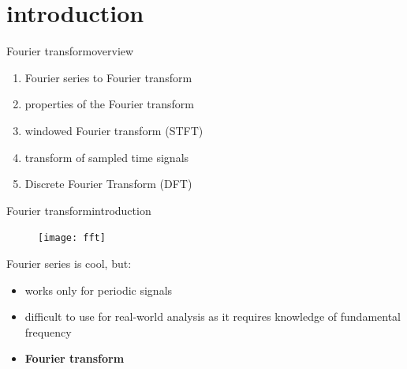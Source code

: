 



\subtitle{Part 8: Fourier Transform}


	

\section[intro]{introduction}
        \begin{frame}{Fourier transform}{overview}
            \begin{enumerate}
                \item   Fourier series to Fourier transform
                \item   properties of the Fourier transform
                \item   windowed Fourier transform (STFT)
                \item   transform of sampled time signals
                \item   Discrete Fourier Transform (DFT)
            \end{enumerate}
        \end{frame}

	\begin{frame}{Fourier transform}{introduction}
		\begin{figure}
			\centering
				\texttt{[image: fft]}
		\end{figure}
		Fourier series is cool, but:
		\begin{itemize}
			\item	works only for periodic signals 
			\item	difficult to use for real-world analysis as it requires knowledge of fundamental frequency
			\item<2->[$\Rightarrow$]	\textbf{Fourier transform}
		\end{itemize}
	\end{frame}	
